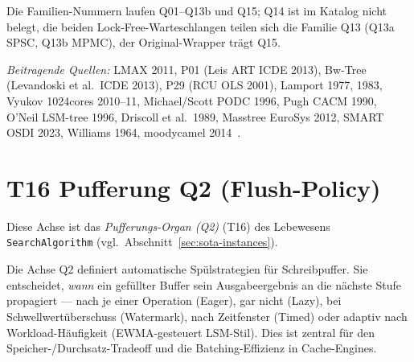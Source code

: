 Die Familien-Nummern laufen Q01--Q13b und Q15; Q14 ist im Katalog nicht belegt, die beiden Lock-Free-Warteschlangen teilen sich die Familie Q13 (Q13a SPSC, Q13b MPMC), der Original-Wrapper trägt Q15.

\emph{Beitragende Quellen:} LMAX 2011, P01 (Leis ART ICDE 2013), Bw-Tree (Levandoski et al.\ ICDE 2013), P29 (RCU OLS 2001), Lamport 1977, 1983, Vyukov 1024cores 2010--11, Michael/\allowbreak{}Scott PODC 1996, Pugh CACM 1990, O'Neil LSM-tree 1996, Driscoll et al.\ 1989, Masstree Euro\allowbreak{}Sys 2012, SMART OSDI 2023, Williams 1964, moodycamel 2014~\cite{thompson2011disruptor,leis2013art,levandoski2013bwtree,mckenney2001rcu,lamport_spsc,lamport1983specifying,vyukov_mpmc,michael1996queue,pugh1990skiplist,oneil1996lsm,driscoll1989persistent,mao2012masstree,luo2023smart,williams1964heapsort,desrochers_concurrentqueue}.

\section{T16 Pufferung Q2 (Flush-Policy)}

Diese Achse ist das \emph{Pufferungs-Organ (Q2)} (T16) des Lebewesens \texttt{SearchAlgorithm} (vgl.\ Abschnitt~\ref{sec:sota-instances}).

Die Achse Q2 definiert automatische Spülstrategien für Schreibpuffer. Sie entscheidet, \emph{wann} ein gefüllter Buffer sein Ausgabeergebnis an die nächste Stufe propagiert --- nach je einer Operation (Eager), gar nicht (Lazy), bei Schwellwertüberschuss (Watermark), nach Zeitfenster (Timed) oder adaptiv nach Workload-Häufigkeit (EWMA-gesteuert LSM-Stil). Dies ist zentral für den Speicher-/\allowbreak{}Durchsatz-Tradeoff und die Batching-Effizienz in Cache-Engines.

